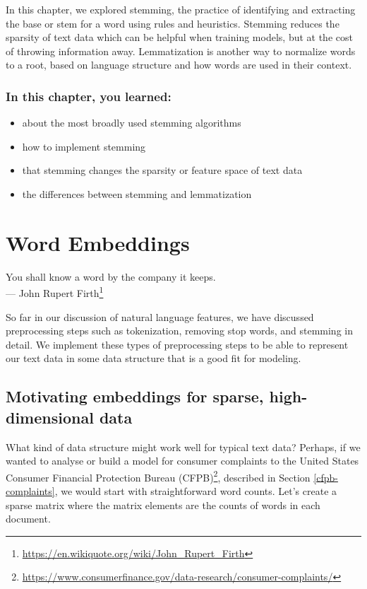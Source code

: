 \documentclass[
]{krantz}
\DeclareRobustCommand{\href}[2]{#2\footnote{\url{#1}}}
\renewenvironment{quote}{\begin{VF}}{\end{VF}}
\renewcommand{\href}[2]{#2\footnote{\url{#1}}}
\begin{document}
In this chapter, we explored stemming, the practice of identifying and extracting the base or stem for a word using rules and heuristics. Stemming reduces the sparsity of text data which can be helpful when training models, but at the cost of throwing information away. Lemmatization is another way to normalize words to a root, based on language structure and how words are used in their context.

\hypertarget{in-this-chapter-you-learned-3}{%
\subsection{In this chapter, you learned:}\label{in-this-chapter-you-learned-3}}

\begin{itemize}
\item
  about the most broadly used stemming algorithms
\item
  how to implement stemming
\item
  that stemming changes the sparsity or feature space of text data
\item
  the differences between stemming and lemmatization
\end{itemize}

\hypertarget{embeddings}{%
\chapter{Word Embeddings}\label{embeddings}}

\begin{quote}
You shall know a word by the company it keeps.\\
\hfill --- \href{https://en.wikiquote.org/wiki/John_Rupert_Firth}{John Rupert Firth}
\end{quote}

So far in our discussion of natural language features, we have discussed preprocessing steps such as tokenization, removing stop words, and stemming in detail. We implement these types of preprocessing steps to be able to represent our text data in some data structure that is a good fit for modeling.

\hypertarget{motivatingsparse}{%
\section{Motivating embeddings for sparse, high-dimensional data}\label{motivatingsparse}}

What kind of data structure might work well for typical text data? Perhaps, if we wanted to analyse or build a model for consumer complaints to the \href{https://www.consumerfinance.gov/data-research/consumer-complaints/}{United States Consumer Financial Protection Bureau (CFPB)}, described in Section \ref{cfpb-complaints}, we would start with straightforward word counts. Let's create a sparse matrix where the matrix elements are the counts of words in each document.
\end{document}

